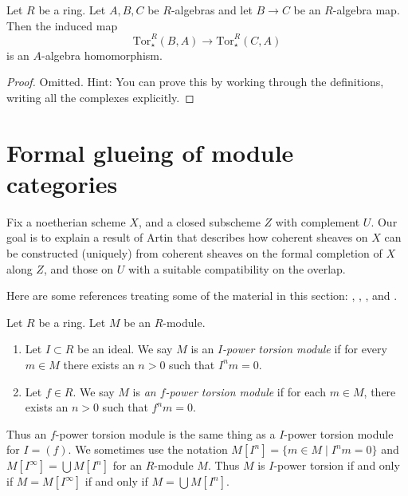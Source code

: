 \begin{lemma}
\label{lemma-functoriality-product-tor}
Let $R$ be a ring. Let $A, B, C$ be $R$-algebras and let $B \to C$ be an
$R$-algebra map. Then the induced map
$$
\text{Tor}^R_{\star}(B, A)
\longrightarrow
\text{Tor}^R_{\star}(C, A)
$$
is an $A$-algebra homomorphism.
\end{lemma}

\begin{proof}
Omitted. Hint: You can prove this by working through the definitions,
writing all the complexes explicitly.
\end{proof}










\section{Formal glueing of module categories}
\label{section-formal-glueing}

\noindent
Fix a noetherian scheme $X$, and a closed subscheme $Z$ with complement $U$.
Our goal is to explain a result of Artin that describes how coherent sheaves on
$X$ can be constructed (uniquely) from coherent sheaves on the formal
completion of $X$ along $Z$, and those on $U$ with a suitable compatibility on
the overlap.

\medskip\noindent
Here are some references treating some of the material in this section:
\cite[Section 2]{ArtinII},
\cite[Appendix]{Ferrand-Raynaud},
\cite{MB}, and
\cite[Section 4.6]{dJ-crystalline}.

\begin{definition}
\label{definition-f-power-torsion}
Let $R$ be a ring. Let $M$ be an $R$-module.
\begin{enumerate}
\item Let $I \subset R$ be an ideal. We say $M$ is an
{\it $I$-power torsion module} if for every $m \in M$ there exists an $n > 0$
such that $I^n m = 0$.
\item Let $f \in R$. We say $M$ is
{\it an $f$-power torsion module} if for each
$m \in M$, there exists an $n > 0$ such that $f^n m = 0$.
\end{enumerate}
\end{definition}

\noindent
Thus an $f$-power torsion module is the same thing as a $I$-power torsion
module for $I = (f)$. We sometimes use the notation
$M[I^n] = \{m \in M \mid I^nm = 0\}$ and $M[I^\infty] = \bigcup M[I^n]$
for an $R$-module $M$. Thus $M$ is $I$-power torsion if and only if
$M = M[I^\infty]$ if and only if $M = \bigcup M[I^n]$.

